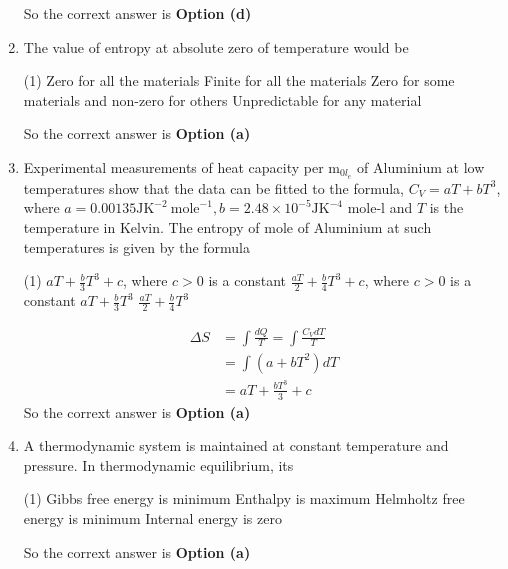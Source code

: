 \begin{enumerate}
\begin{tasks}
\end{tasks}
\begin{answer}
So the corrext answer is \textbf{Option (d)}
\end{answer}
\item The value of entropy at absolute zero of temperature would be
 \begin{tasks}(1)
	\task[\textbf{a.}]Zero for all the materials
	\task[\textbf{b.}]Finite for all the materials
	\task[\textbf{c.}]Zero for some materials and non-zero for others
	\task[\textbf{d.}] Unpredictable for any material
\end{tasks}
\begin{answer}
So the corrext answer is \textbf{Option (a)}
\end{answer}
\item Experimental measurements of heat capacity per $\mathrm{m}_{0 l_{e}}$ of Aluminium at low temperatures show that the data can be fitted to the formula, $C_{V}=a T+b T^{3}$, where $a=0.00135 \mathrm{JK}^{-2} \mathrm{~mole}^{-1}, b=2.48 \times 10^{-5} \mathrm{JK}^{-4}$ mole-l and $T$ is the temperature in Kelvin. The entropy of mole of Aluminium at such temperatures is given by the formula
 \begin{tasks}(1)
	\task[\textbf{a.}]$a T+\frac{b}{3} T^{3}+c$, where $c>0$ is a constant
	\task[\textbf{b.}]$\frac{a T}{2}+\frac{b}{4} T^{3}+c$, where $c>0$ is a constant
	\task[\textbf{c.}]$a T+\frac{b}{3} T^{3}$
	\task[\textbf{d.}] $\frac{a T}{2}+\frac{b}{4} T^{3}$
\end{tasks}
\begin{answer}
	$$
	\begin{aligned}
	\Delta S &=\int \frac{d Q}{T}=\int \frac{C_{V} d T}{T} \\
	&=\int\left(a+b T^{2}\right) d T \\
	&=a T+\frac{b T^{3}}{3}+c
\end{aligned}
$$
So the corrext answer is \textbf{Option (a)}
\end{answer}
\item A thermodynamic system is maintained at constant temperature and pressure. In thermodynamic equilibrium, its
 \begin{tasks}(1)
	\task[\textbf{a.}]Gibbs free energy is minimum
	\task[\textbf{b.}]Enthalpy is maximum
	\task[\textbf{c.}]Helmholtz free energy is minimum
	\task[\textbf{d.}]Internal energy is zero
\end{tasks}
\begin{answer}
So the corrext answer is \textbf{Option (a)}

\end{answer}
\end{enumerate}

